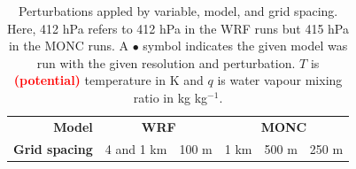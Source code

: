 \documentclass[draft]{agujournal2019}
\newcommand{\todo}[1]{\textcolor{red}{\textbf{(#1)}}}
\begin{document}
{
\begin{table}
    \centering
    \caption{Perturbations appled by variable, model, and grid spacing. Here,
    412 hPa refers to 412 hPa in the WRF runs but 415 hPa in the MONC runs. A
    $\bullet{}$ symbol indicates the given model was run with the given
    resolution and perturbation. $T$ is \todo{potential} temperature in K and
    $q$ is water vapour mixing ratio in kg kg$^{-1}$.}
    \label{tab:pert_runs}
    \renewcommand{\arraystretch}{0.6}
    \begin{tabular}{lllccccc}
        \multicolumn{3}{r}{\textbf{Model}} & \multicolumn{2}{c}{\textbf{WRF}} & \multicolumn{3}{c}{\textbf{MONC}} \\
        \multicolumn{3}{r}{\textbf{Grid spacing}} & 4 and 1 km & 100 m & 1 km & 500 m & 250 m \\
        

\end{tabular}
\end{table}}
\end{document}

